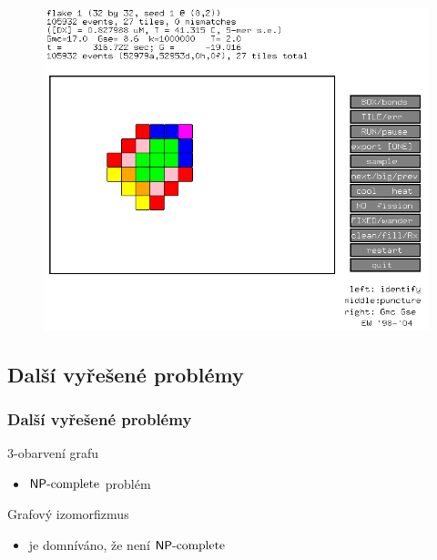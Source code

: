 \documentclass[10pt]{beamer}
\newcommand{\NPC}{\mathsf{NP}\textnormal{-complete}}
\theoremstyle{definition}
\theoremstyle{remark}
\begin{document}
\begin{frame}[plain]
	\begin{figure}[h]
	\begin{center}
		\includegraphics[scale=0.45]{../figures/xgrow/xgrow.png}
	\end{center}
	\end{figure}
\end{frame}

\subsection{Další vyřešené problémy}
\begin{frame}
\frametitle{Další vyřešené problémy}
	$3$-obarvení grafu
	\begin{itemize}
		\item $\NPC$ problém
	\end{itemize}
	Grafový izomorfizmus
	\begin{itemize}
		\item je domníváno, že není $\NPC$
	\end{itemize}
\end{frame}
\end{document}
